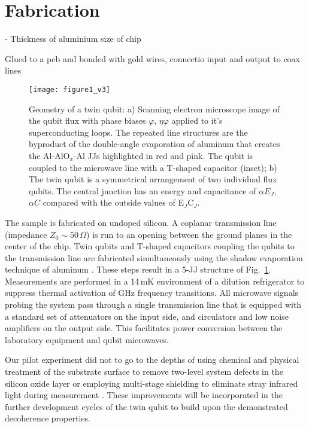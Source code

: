 \section{Fabrication}
- Thickness of aluminium size of chip

Glued to  a pcb and bonded  with gold wires,  connectio input and output  to coax
lines

\begin{figure}[h]
  \texttt{[image: figure1\_v3]}
  \caption{\small Geometry of a twin qubit: a) Scanning electron microscope image
    of  the  qubit flux  with  phase  biases  $ \varphi  $,  $  \eta\varphi  $ applied  to  it's
    superconducting loops. The repeated line  structures are the byproduct of the
    double-angle  evaporation  of aluminum  that  creates  the Al-AlO$_x$-Al  JJs
    highlighted in red and pink. The qubit  is coupled to the microwave line with
    a T-shaped capacitor (inset); b) The  twin qubit is a symmetrical arrangement
    of  two individual  flux  qubits.  The  central junction  has  an energy  and
    capacitance  of  $ \alpha  E_{J}$,  $\alpha  C$ compared  with  the  outside values  of
    E$_J$C$_J$.}
  \label{fig:setup}
\end{figure}

\noindent The  sample is fabricated  on undoped silicon. A  coplanar transmission
line (impedance $ Z_{0} \sim 50\,\Omega $) is run to an opening between the ground planes
in  the center  of the  chip. Twin  qubits and  T-shaped capacitors  coupling the
qubits to  the transmission line  are fabricated simultaneously using  the shadow
evaporation technique  of aluminum  \cite{wu2013}. These steps  result in  a 5-JJ
structure  of  Fig.~\ref{fig:setup}.  Measurements  are  performed  in  a  14\,mK
environment  of a  dilution refrigerator  to suppress  thermal activation  of GHz
frequency transitions.  All  microwave signals probing the system  pass through a
single transmission line  that is equipped with a standard  set of attenuators on
the input  side, and  circulators and  low noise amplifiers  on the  output side.
This  facilitates power  conversion between  the laboratory  equipment and  qubit
microwaves.

Our pilot experiment did  not to go to the depths of  using chemical and physical
treatment of  the substrate  surface to  remove two-level  system defects  in the
silicon  oxide layer  \cite{earnest2018}  or employing  multi-stage shielding  to
eliminate  stray infrared  light  during  measurement \cite{barends2011}.   These
improvements will be  incorporated in the further development cycles  of the twin
qubit to build upon the demonstrated decoherence properties.





